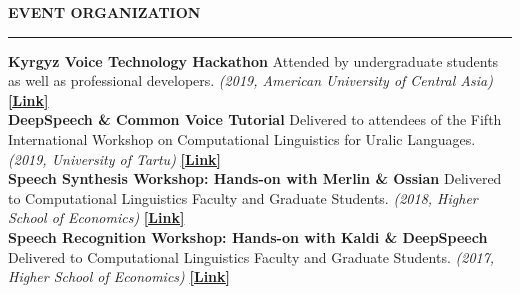 \documentclass{resume} %
\begin{document}




\begin{minipage}{\textwidth}
\sectionskip
\MakeUppercase{\textbf{Event Organization}}
  \sectionlineskip
  \hrule
\vspace{.5cm}

{\bf Kyrgyz Voice Technology Hackathon} {Attended by undergraduate students as well as professional developers.} {\em (2019, American University of Central Asia)} \hfill {\href{https://jrmeyer.github.io/kyrgyz-voice-hackathon/}{\textbf{[Link]}}} \\

{\bf DeepSpeech \& Common Voice Tutorial} {Delivered to attendees of the Fifth International Workshop on Computational Linguistics for Uralic Languages.} {\em (2019, University of Tartu)} \hfill { \href{https://sisu.ut.ee/iwclul2019/avaleht}{\textbf{[Link]}}} \\

{\bf Speech Synthesis Workshop: Hands-on with Merlin \& Ossian} {Delivered to Computational Linguistics Faculty and Graduate Students.} {\em (2018, Higher School of Economics)} \hfill {\href{http://jrmeyer.github.io/tts/2016/12/09/tts-workshop.html}{\textbf{[Link]}}} \\

{\bf Speech Recognition Workshop: Hands-on with Kaldi \& DeepSpeech} {Delivered to Computational Linguistics Faculty and Graduate Students.} {\em (2017, Higher School of Economics)} \hfill {\href{http://jrmeyer.github.io/misc/stt-vishka.pdf}{\textbf{[Link]}}}\\

\end{minipage}



\end{document}
